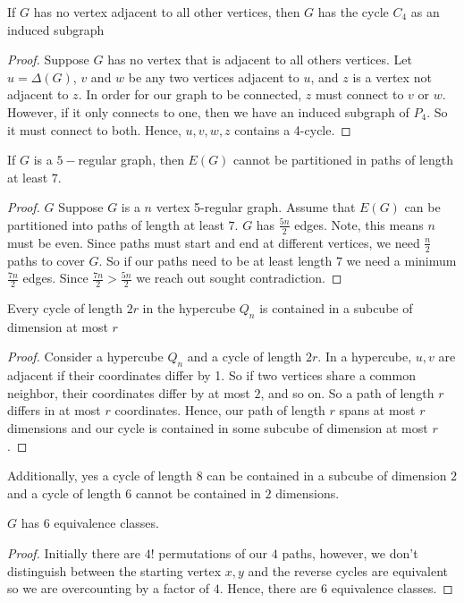 \documentclass{article}
\newenvironment{claim}[2][Claim]{\begin{trivlist}
		\item[\hskip \labelsep {\bfseries #1}\hskip \labelsep {\bfseries #2}]}{\end{trivlist}}
\begin{document}
\begin{claim}{2.b}
	If $G$ has no vertex adjacent to all other vertices, then $G$ has the cycle $C_4$ as an induced subgraph
\end{claim}
\begin{proof}
	Suppose $G$ has no vertex that is adjacent to all others vertices. Let $u  = \Delta(G)$, $v$ and $w$ be any two vertices adjacent to $u$, and $z$ is a vertex not adjacent to $z$. In order for our graph to be connected, $z$ must connect to $v$ or $w$. 
	However, if it only connects to one, then we have an induced subgraph of $P_4$. So it must connect to both. Hence, $u,v,w,z$ contains a 4-cycle.
\end{proof}

\begin{claim}{3}
	If $G$ is a $5-$regular graph, then $E(G)$ cannot be partitioned in paths of length at least $7$.
\end{claim}
\begin{proof}
 $G$ Suppose $G$ is a $n$ vertex 5-regular graph. Assume that $E(G)$ can be partitioned into paths of length at least $7$. $G$ has $\frac{5n}{2}$ edges. Note, this means $n$ must be even. Since paths must start and end at different vertices, we need $\frac{n}{2}$ paths to cover $G$. So if our paths need to be at least length $7$ we need a minimum $\frac{7n}{2}$ edges. Since $\frac{7n}{2} > \frac{5n}{2}$ we reach out sought contradiction.
\end{proof}

\begin{claim}{4}
	Every cycle of length $2r$ in the hypercube $Q_n$ is contained in a subcube of dimension at most $r$
\end{claim}
\begin{proof}
	Consider a hypercube $Q_n$ and a cycle of length $2r$. In a hypercube, $u,v$ are adjacent if their coordinates differ by 1. So if two vertices share a common neighbor, their coordinates differ by at most $2$, and so on. So a path of length $r$ differs in at most $r$ coordinates. Hence, our path of length $r$ spans at most $r$ dimensions and our cycle is contained in some subcube of dimension at most $r$.
\end{proof}
Additionally, yes a cycle of length 8 can be contained in a subcube of dimension $2$ and
a cycle of length $6$ cannot be contained in $2$ dimensions.
\begin{claim}{5}
	$G$ has $6$ equivalence classes.
\end{claim}
\begin{proof}
Initially there are $4!$ permutations of our $4$ paths, however, we don't distinguish between the starting vertex $x,y$ and the reverse cycles are equivalent so we are overcounting by a factor of $4$. Hence, there are $6$ equivalence classes.
\end{proof}
\end{document}

